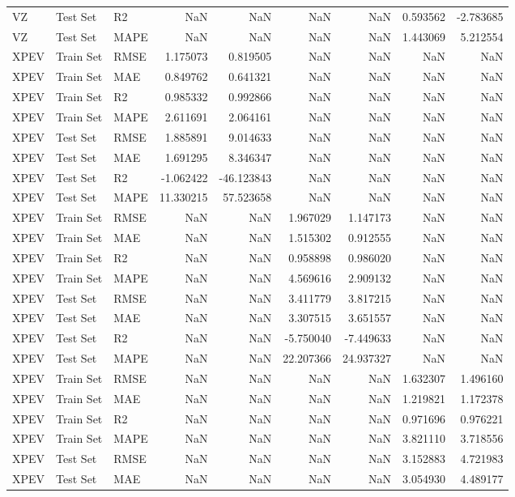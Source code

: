 \begin{tabular}{lllrrrrrr}
VZ & Test Set & R2 & NaN & NaN & NaN & NaN & 0.593562 & -2.783685 \\
VZ & Test Set & MAPE & NaN & NaN & NaN & NaN & 1.443069 & 5.212554 \\
XPEV & Train Set & RMSE & 1.175073 & 0.819505 & NaN & NaN & NaN & NaN \\
XPEV & Train Set & MAE & 0.849762 & 0.641321 & NaN & NaN & NaN & NaN \\
XPEV & Train Set & R2 & 0.985332 & 0.992866 & NaN & NaN & NaN & NaN \\
XPEV & Train Set & MAPE & 2.611691 & 2.064161 & NaN & NaN & NaN & NaN \\
XPEV & Test Set & RMSE & 1.885891 & 9.014633 & NaN & NaN & NaN & NaN \\
XPEV & Test Set & MAE & 1.691295 & 8.346347 & NaN & NaN & NaN & NaN \\
XPEV & Test Set & R2 & -1.062422 & -46.123843 & NaN & NaN & NaN & NaN \\
XPEV & Test Set & MAPE & 11.330215 & 57.523658 & NaN & NaN & NaN & NaN \\
XPEV & Train Set & RMSE & NaN & NaN & 1.967029 & 1.147173 & NaN & NaN \\
XPEV & Train Set & MAE & NaN & NaN & 1.515302 & 0.912555 & NaN & NaN \\
XPEV & Train Set & R2 & NaN & NaN & 0.958898 & 0.986020 & NaN & NaN \\
XPEV & Train Set & MAPE & NaN & NaN & 4.569616 & 2.909132 & NaN & NaN \\
XPEV & Test Set & RMSE & NaN & NaN & 3.411779 & 3.817215 & NaN & NaN \\
XPEV & Test Set & MAE & NaN & NaN & 3.307515 & 3.651557 & NaN & NaN \\
XPEV & Test Set & R2 & NaN & NaN & -5.750040 & -7.449633 & NaN & NaN \\
XPEV & Test Set & MAPE & NaN & NaN & 22.207366 & 24.937327 & NaN & NaN \\
XPEV & Train Set & RMSE & NaN & NaN & NaN & NaN & 1.632307 & 1.496160 \\
XPEV & Train Set & MAE & NaN & NaN & NaN & NaN & 1.219821 & 1.172378 \\
XPEV & Train Set & R2 & NaN & NaN & NaN & NaN & 0.971696 & 0.976221 \\
XPEV & Train Set & MAPE & NaN & NaN & NaN & NaN & 3.821110 & 3.718556 \\
XPEV & Test Set & RMSE & NaN & NaN & NaN & NaN & 3.152883 & 4.721983 \\
XPEV & Test Set & MAE & NaN & NaN & NaN & NaN & 3.054930 & 4.489177 \\

\end{tabular}
